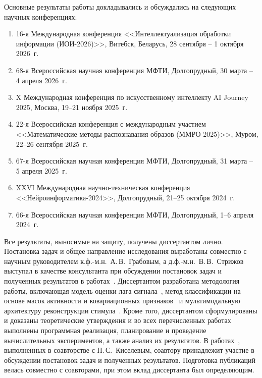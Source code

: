 {\probation} Основные результаты работы докладывались и обсуждались на следующих научных конференциях:
\begin{enumerate}
    \item 16-я Международная конференция <<Интеллектуализация обработки информации (ИОИ-2026)>>,
    Витебск, Беларусь, 28 сентября -- 1 октября 2026~г.
    \item 68-я Всероссийская научная конференция МФТИ,
    Долгопрудный, 30 марта -- 4 апреля 2026~г.
    \item X Международная конференция по искусственному интеллекту AI Journey 2025,
    Москва, 19--21 ноября 2025~г.
    \item 22-я Всероссийская конференция с международным участием
    <<Математические методы распознавания образов (ММРО-2025)>>,
    Муром, 22--26 сентября 2025~г.
    \item 67-я Всероссийская научная конференция МФТИ,
    Долгопрудный, 31 марта -- 5 апреля 2025~г.
    \item XXVI Международная научно-техническая конференция <<Нейроинформатика-2024>>,
    Долгопрудный, 21--25 октября 2024~г.
    \item 66-я Всероссийская научная конференция МФТИ,
    Долгопрудный, 1--6 апреля 2024~г.
\end{enumerate}


{\contribution} Все результаты, выносимые на защиту, получены диссертантом лично. Постановка задач и общее направление исследования выработаны совместно с научным руководителем к.ф.-м.н.~А.\,В.~Грабовым, а д.ф.-м.н.~В.\,В.~Стрижов выступал в качестве консультанта при обсуждении постановок задач и полученных результатов в работах~\cite{dorin2025enhancing, dorin2024forecasting}. Диссертантом разработана методология работы, включающая модель оценки лага сигнала~\cite{dorin2024forecasting, dorin2024conf66mipt}, метод классификации на основе масок активности и ковариационных признаков~\cite{dorin2025enhancing, dorin2025conf67mipt, dorin2026ioi} и мультимодальную архитектуру реконструкции стимула~\cite{dorin2026decoding, dorin2026conf68mipt, dorin2025mmro}. Кроме того, диссертантом сформулированы и доказаны теоретические утверждения и во всех перечисленных работах выполнены программная реализация, планирование и проведение вычислительных экспериментов, а также анализ их результатов. В работах~\cite{dorin2026decoding, dorin2024forecasting, dorin2024conf66mipt, dorin2025mmro}, выполненных в соавторстве с Н.\,С.~Киселевым, соавтору принадлежит участие в обсуждении постановок задач и полученных результатов. Подготовка публикаций велась совместно с соавторами, при этом вклад диссертанта был определяющим.

